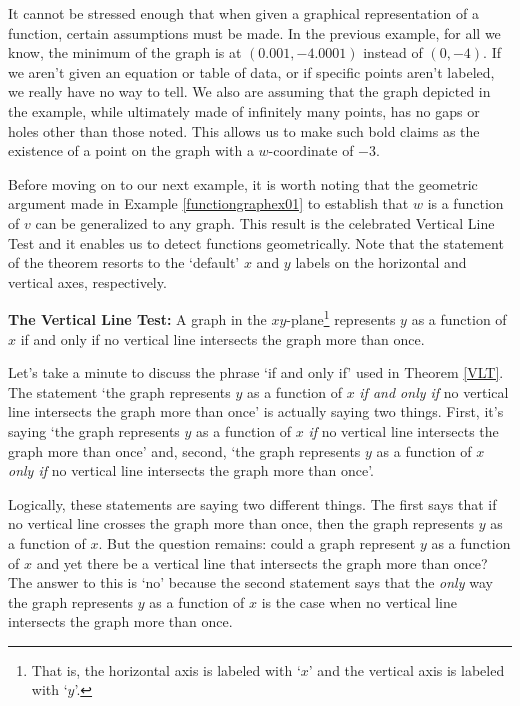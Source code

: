 It cannot be stressed enough that when given a graphical representation of a function, certain assumptions must be made.  In the previous example, for all we know, the minimum of the graph is at $(0.001, -4.0001)$ instead of $(0,-4)$.  If we aren't given an equation or table of data, or if specific points aren't labeled, we really have no way to tell.  We also are assuming that the graph depicted in the example, while ultimately made of infinitely many points, has no gaps or holes other than those noted.  This allows us to make such bold claims as the existence of a point on the graph with a $w$-coordinate of $-3$. 

\medskip

Before moving on to our next example, it is worth noting that the geometric argument made in Example  \ref{functiongraphex01} to establish that $w$ is a function of $v$  can be generalized to any graph.  This result is the celebrated Vertical Line Test and it enables us to detect functions geometrically.   Note that the statement of the theorem resorts to the `default' $x$ and $y$ labels on the horizontal and vertical axes, respectively.

\begin{tcolorbox}

\begin{thm}  \textbf{The Vertical Line Test:}   A graph in the $xy$-plane\footnote{That is, the horizontal axis is labeled with `$x$' and the vertical axis is labeled with `$y$'.}  represents $y$ as a function of $x$ if and only if no vertical line intersects the graph more than once.
\label{VLT}

\end{thm}

\end{tcolorbox}

Let's take a minute to discuss the phrase `if and only if' used in Theorem \ref{VLT}.   The statement `the graph represents $y$ as a function of $x$ \textit{if and only if} no vertical line intersects the graph more than once' is actually saying two things.  First, it's saying `the graph represents $y$ as a function of $x$  \textit{if} no vertical line intersects the graph more than once' and, second,  `the graph represents $y$ as a function of $x$  \textit{only if} no vertical line intersects the graph more than once'.   

\medskip

Logically, these statements are saying two different things. The first says that if no vertical line crosses the graph more than once, then the graph represents $y$ as a function of $x$.  But the question remains:  could a graph represent $y$ as a function of $x$ and yet there be a vertical line that intersects the graph more than once?  The answer to this is `no' because the second statement says that the \textit{only} way the graph represents $y$ as a function of $x$ is the case when no vertical line intersects the graph more than once.

